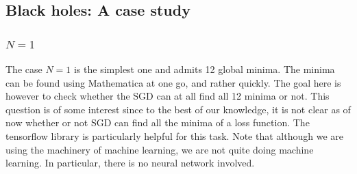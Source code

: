 \documentclass[12pt,a4paper]{JHEP3}
\begin{document}
 
\subsection{Black holes: A case study}

\subsubsection{$N=1$}

The case $N=1$ is the simplest one and admits 12 global minima. The minima can be found using Mathematica \cite{Mathematica} at one go, and rather quickly. The goal here is however to check whether the SGD can at all find all 12 minima or not. This question is of some interest since to the best of our knowledge, it is not clear as of now whether or  not SGD can find all the minima of a loss function. The tensorflow library \cite{tensorflow2015-whitepaper} is particularly helpful for this task. Note that although we are using the machinery of machine learning, we are not quite doing machine learning. In particular, there is no neural network involved.
\end{document}
